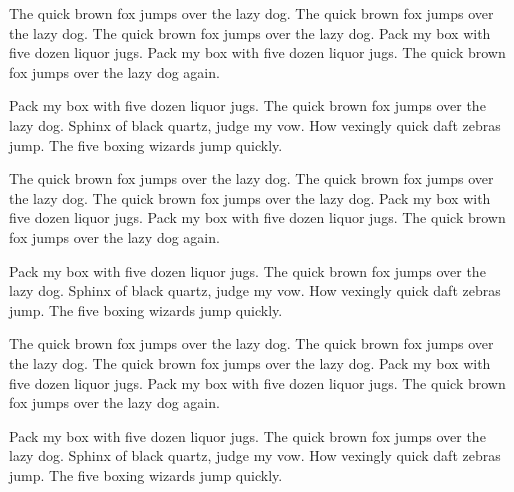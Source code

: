 \hsize=6.5in
\vsize=1.0in
\nopagenumbers
\noindent
The quick brown fox jumps over the lazy dog. The quick brown fox jumps
over the lazy dog. The quick brown fox jumps over the lazy dog. Pack my box
with five dozen liquor jugs. Pack my box with five dozen liquor jugs. The
quick brown fox jumps over the lazy dog again.
\par
\noindent
Pack my box with five dozen liquor jugs. The quick brown fox jumps over the
lazy dog. Sphinx of black quartz, judge my vow. How vexingly quick daft
zebras jump. The five boxing wizards jump quickly.
\par
\noindent
The quick brown fox jumps over the lazy dog. The quick brown fox jumps
over the lazy dog. The quick brown fox jumps over the lazy dog. Pack my box
with five dozen liquor jugs. Pack my box with five dozen liquor jugs. The
quick brown fox jumps over the lazy dog again.
\par
\noindent
Pack my box with five dozen liquor jugs. The quick brown fox jumps over the
lazy dog. Sphinx of black quartz, judge my vow. How vexingly quick daft
zebras jump. The five boxing wizards jump quickly.
\par
\noindent
The quick brown fox jumps over the lazy dog. The quick brown fox jumps
over the lazy dog. The quick brown fox jumps over the lazy dog. Pack my box
with five dozen liquor jugs. Pack my box with five dozen liquor jugs. The
quick brown fox jumps over the lazy dog again.
\par
\noindent
Pack my box with five dozen liquor jugs. The quick brown fox jumps over the
lazy dog. Sphinx of black quartz, judge my vow. How vexingly quick daft
zebras jump. The five boxing wizards jump quickly.
\par
\bye
